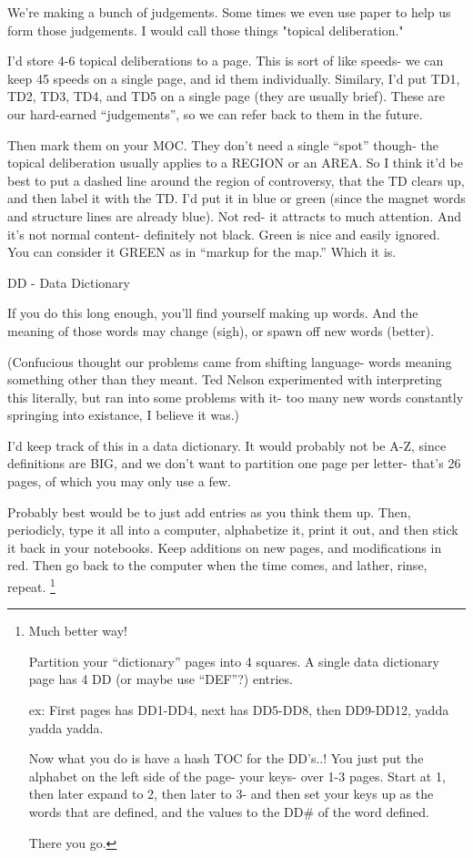\documentclass[oneside]{book}
\begin{document}
  We're making a bunch of judgements. Some times we even use paper to
help us form those judgements. I would call those things "topical
deliberation."

  I'd store 4-6 topical deliberations to a page. This is sort of like
speeds- we can keep 45 speeds on a single page, and id them
individually. Similary, I'd put TD1, TD2, TD3, TD4, and TD5 on a
single page (they are usually brief). These are our hard-earned
``judgements'', so we can refer back to them in the future.

  Then mark them on your MOC. They don't need a single ``spot'' though-
the topical deliberation usually applies to a REGION or an AREA. So I
think it'd be best to put a dashed line around the region of
controversy, that the TD clears up, and then label it with the TD. I'd
put it in blue or green (since the magnet words and structure lines
are already blue). Not red- it attracts to much attention. And it's
not normal content- definitely not black. Green is nice and easily
ignored. You can consider it GREEN as in ``markup for the map.'' Which
it is.


DD - Data Dictionary

  If you do this long enough, you'll find yourself making up
words. And the meaning of those words may change (sigh), or spawn off
new words (better).

  (Confucious thought our problems came from shifting language- words
meaning something other than they meant. Ted Nelson experimented with
interpreting this literally, but ran into some problems with it- too
many new words constantly springing into existance, I believe it was.)

  I'd keep track of this in a data dictionary. It would probably not
be A-Z, since definitions are BIG, and we don't want to partition one
page per letter- that's 26 pages, of which you may only use a few.

  Probably best would be to just add entries as you think them
up. Then, periodicly, type it all into a computer, alphabetize it,
print it out, and then stick it back in your notebooks. Keep additions
on new pages, and modifications in red. Then go back to the computer
when the time comes, and lather, rinse, repeat.
\footnote{
Much better way!

Partition your ``dictionary'' pages into 4 squares. A single data
dictionary page has 4 DD (or maybe use ``DEF''?) entries.

ex: First pages has DD1-DD4, next has DD5-DD8, then DD9-DD12, yadda
yadda yadda.

Now what you do is have a hash TOC for the DD's..! You just put the
alphabet on the left side of the page- your keys- over 1-3
pages. Start at 1, then later expand to 2, then later to 3- and then
set your keys up as the words that are defined, and the values to the
DD\# of the word defined.

There you go. 
}
\end{document}
